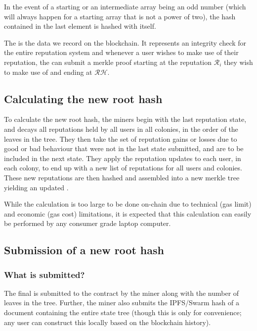 In the event of a starting or an intermediate array being an odd number (which will always happen for a starting array that is not a power of two), the hash contained in the last element is hashed with itself.

The  is the data we record on the blockchain. It represents an integrity check for the entire reputation system and whenever a user wishes to make use of their reputation, the can submit a merkle proof starting at the reputation $\mathcal{R}_i$ they wish to make use of and ending at $\mathcal{RH}$.

\subsection{Calculating the new root hash}
To calculate the new root hash, the miners begin with the last reputation state, and decays all reputations held by all users in all colonies, in the order of the leaves in the tree. They then take the set of reputation gains or losses due to good or bad behaviour that were not in the last state submitted, and are to be included in the next state. They apply the reputation updates to each user, in each colony, to end up with a new list of reputations for all users and colonies. These new reputations are then hashed and assembled into a new merkle tree yielding an updated .

While the calculation is too large to be done on-chain due to technical (gas limit) and economic (gas cost) limitations, it is expected that this calculation can easily be performed by any consumer grade laptop computer.

\subsection{Submission of a new root hash}
%
\subsubsection*{What is submitted?}
The final  is submitted to the contract by the miner along with the number of leaves in the tree. Further, the miner also submits the IPFS/Swarm hash of a document containing the entire state tree (though this is only for convenience; any user can construct this locally based on the blockchain history).
%
